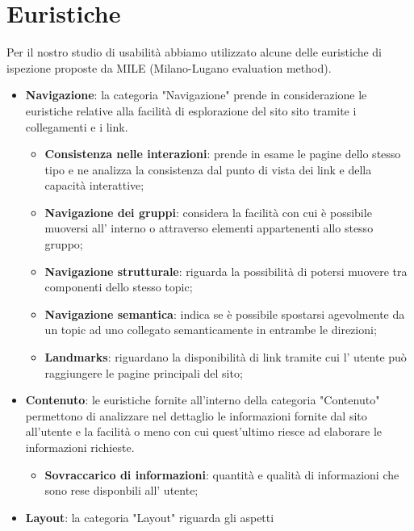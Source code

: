     \section{Euristiche}
    Per il nostro studio di usabilità abbiamo utilizzato alcune delle euristiche
    di ispezione proposte da MILE (Milano-Lugano evaluation method).
    \begin{itemize}
        \item \textbf{Navigazione}: la categoria "Navigazione" prende in
        considerazione le euristiche relative alla facilità di esplorazione del sito
        sito tramite i collegamenti e i link.
        \begin{itemize}
            \item \textbf{Consistenza nelle interazioni}: prende in esame le
            pagine dello stesso tipo e ne analizza la consistenza dal punto
            di vista dei link e della capacità interattive;
            \item \textbf{Navigazione dei gruppi}: considera la facilità con
            cui è possibile muoversi all' interno o attraverso elementi
            appartenenti allo stesso gruppo;
            \item \textbf{Navigazione strutturale}: riguarda la possibilità
            di potersi muovere tra componenti dello stesso topic;
            \item \textbf{Navigazione semantica}: indica se è possibile
            spostarsi agevolmente da un topic ad uno collegato
            semanticamente in entrambe le direzioni;
            \item \textbf{Landmarks}: riguardano la disponibilità di link
            tramite cui l' utente può raggiungere le pagine principali del
            sito;
        \end{itemize}
        \item \textbf{Contenuto}: le euristiche fornite all'interno della categoria
        "Contenuto" permettono di analizzare nel dettaglio le informazioni fornite
        dal sito all'utente e la facilità o meno con cui quest'ultimo riesce ad 
        elaborare le informazioni richieste.
        \begin{itemize}
            \item \textbf{Sovraccarico di informazioni}: quantità e qualità
            di informazioni che sono rese disponbili all' utente;
        \end{itemize}
        \item \textbf{Layout}: la categoria "Layout" riguarda gli aspetti

\end{itemize}
